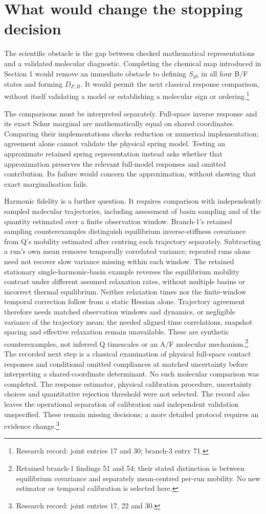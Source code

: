 \documentclass{article}
\begin{document}
\section{What would change the stopping decision}
The scientific obstacle is the gap between checked mathematical representations and a validated molecular diagnostic. Completing the chemical map introduced in Section 1 would remove an immediate obstacle to defining \(S_{gh}\) in all four B/F states and forming \(D_{F;B}\). It would permit the next classical response comparison, without itself validating a model or establishing a molecular sign or ordering.\footnote{Research record: joint entries 17 and 30; branch-3 entry 71.}

The comparisons must be interpreted separately. Full-space inverse response and its exact Schur marginal are mathematically equal on shared coordinates. Comparing their implementations checks reduction or numerical implementation; agreement alone cannot validate the physical spring model. Testing an approximate retained spring representation instead asks whether that approximation preserves the relevant full-model responses and omitted contribution. Its failure would concern the approximation, without showing that exact marginalisation fails.

Harmonic fidelity is a further question. It requires comparison with independently sampled molecular trajectories, including assessment of basin sampling and of the quantity estimated over a finite observation window. Branch-1's retained sampling counterexamples distinguish equilibrium inverse-stiffness covariance from Q's mobility estimated after centring each trajectory separately. Subtracting a run's own mean removes temporally correlated variance; repeated runs alone need not recover slow variance missing within each window. The retained stationary single-harmonic-basin example reverses the equilibrium mobility contrast under different assumed relaxation rates, without multiple basins or incorrect thermal equilibrium. Neither relaxation times nor the finite-window temporal correction follow from a static Hessian alone. Trajectory agreement therefore needs matched observation windows and dynamics, or negligible variance of the trajectory mean; the needed aligned time correlations, snapshot spacing and effective relaxation remain unavailable. These are synthetic counterexamples, not inferred Q timescales or an A/F molecular mechanism.\footnote{Retained branch-1 findings 51 and 54; their stated distinction is between equilibrium covariance and separately mean-centred per-run mobility. No new estimator or temporal calibration is selected here.} The recorded next step is a classical examination of physical full-space contact responses and conditional omitted compliances at matched uncertainty before interpreting a shared-coordinate determinant. No such molecular comparison was completed. The response estimator, physical calibration procedure, uncertainty choices and quantitative rejection threshold were not selected. The record also leaves the operational separation of calibration and independent validation unspecified. These remain missing decisions; a more detailed protocol requires an evidence change.\footnote{Research record: joint entries 17, 22 and 30.}
\end{document}
